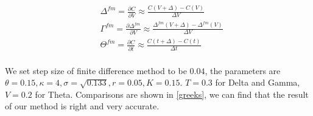 $$
\begin{aligned}
    &\Delta^{fm} = \frac{\partial C}{\partial V} \approx \frac{C(V+\Delta)-C(V)}{\Delta V} \\
    &\Gamma^{fm} = \frac{\partial \Delta^{fm}}{\partial V} \approx \frac{\Delta^{fm}(V+\Delta)-\Delta^{fm}(V)}{\Delta V} \\
    &\Theta^{fm} = \frac{\partial C}{\partial t} \approx \frac{C(t+\Delta)-C(t)}{\Delta t} \\
\end{aligned}
$$

\noindent We set step size of finite difference method to be $0.04$, the parameters are $\theta = 0.15, \kappa = 4,\sigma = \sqrt{0.133},r = 0.05, K = 0.15$. $T=0.3$ for Delta and Gamma, $V=0.2$ for Theta. Comparisons are shown in \ref{greeks}, we can find that the result of our method is right and very accurate.

